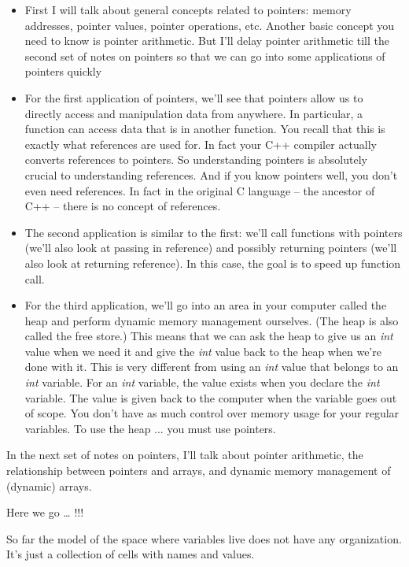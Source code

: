 \begin{itemize}
\tightlist
\item
  First I will talk about general concepts related to pointers: memory
  addresses, pointer values, pointer operations, etc. Another basic
  concept you need to know is pointer arithmetic. But I'll delay pointer
  arithmetic till the second set of notes on pointers so that we can go
  into some applications of pointers quickly
\item
  For the first application of pointers, we'll see that pointers allow
  us to directly access and manipulation data from anywhere. In
  particular, a function can access data that is in another function.
  You recall that this is exactly what references are used for. In fact
  your C++ compiler actually converts references to pointers. So
  understanding pointers is absolutely crucial to understanding
  references. And if you know pointers well, you don't even need
  references. In fact in the original C language -- the ancestor of C++
  -- there is no concept of references.
\item
  The second application is similar to the first: we'll call functions
  with pointers (we'll also look at passing in reference) and possibly
  returning pointers (we'll also look at returning reference). In this
  case, the goal is to speed up function call.
\item
  For the third application, we'll go into an area in your computer
  called the heap and perform dynamic memory management ourselves. (The
  heap is also called the free store.) This means that we can ask the
  heap to give us an \emph{int} value when we need it and give the
  \emph{int} value back to the heap when we're done with it. This is
  very different from using an \emph{int} value that belongs to an
  \emph{int} variable. For an \emph{int} variable, the value exists when
  you declare the \emph{int} variable. The value is given back to the
  computer when the variable goes out of scope. You don't have as much
  control over memory usage for your regular variables. To use the heap
  ... you must use pointers.
\end{itemize}

In the next set of notes on pointers, I'll talk about pointer arithmetic, the relationship between pointers and arrays, and dynamic memory management of (dynamic) arrays.

Here we go \ldots{} !!!

\newpage{}

So far the model of the space where variables live does not have any organization. It's just a collection of cells with names and values.

